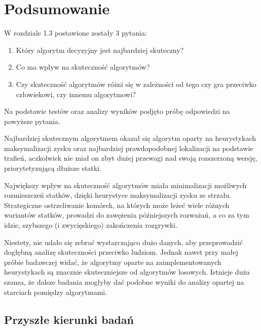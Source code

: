 \newpage %
\section{Podsumowanie}

W rozdziale 1.3 postawione zostały 3 pytania:

\begin{enumerate}
    \item Który algorytm decyzyjny jest najbardziej skuteczny?
    \item Co ma wpływ na skuteczność algorytmów?
    \item Czy skuteczność algorytmów różni się w zależności od tego czy gra przeciwko człowiekowi, czy innemu algorytmowi?
\end{enumerate}

Na podstawie testów oraz analizy wyników podjęto próbę odpowiedzi na powyższe pytania.

Najbardziej skutecznym algorytmem okazał się algorytm oparty na heurystykach maksymalizacji zysku oraz najbardziej prawdopodobnej lokalizacji na podstawie trafień, aczkolwiek nie miał on zbyt dużej przewagi nad swoją rozszerzoną wersję, priorytetyzującą dłuższe statki.

Największy wpływ na skuteczność algorytmów miała minimalizacji możliwych rozmieszczeń statków, dzięki heurystyce maksymalizacji zysku ze strzału. Strategiczne ostrzeliwanie komórek, na których może leżeć wiele różnych wariantów statków, prowadzi do zawężenia późniejszych rozważań, a co za tym idzie, szybszego (i zwycięskiego) zakończenia rozgrywki.

Niestety, nie udało się zebrać wystarczająco dużo danych, aby przeprowadzić dogłębną analizę skuteczności przeciwko ludziom. Jednak nawet przy małej próbie badawczej widać, że algorytmy oparte na zaimplementowanych heurystykach są znacznie skuteczniejsze od algorytmów losowych. Istnieje duża szansa, że dalsze badania mogłyby dać podobne wyniki do analizy opartej na starciach pomiędzy algorytmami.

\subsection{Przyszłe kierunki badań}

